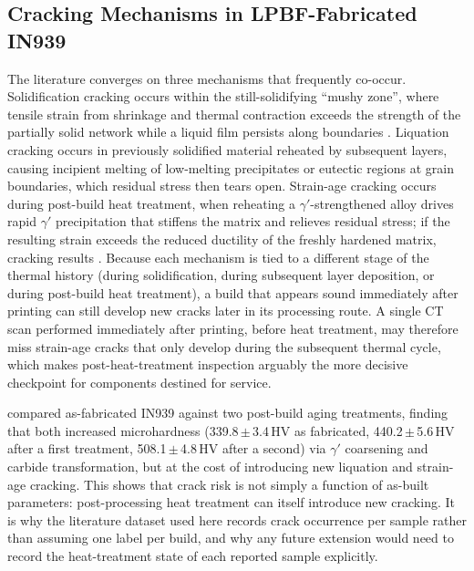 \documentclass[a4paper]{article}
\begin{document}
\subsection{Cracking Mechanisms in LPBF-Fabricated IN939}
The literature converges on three mechanisms that frequently co-occur. Solidification cracking occurs within the still-solidifying ``mushy zone'', where tensile strain from shrinkage and thermal contraction exceeds the strength of the partially solid network while a liquid film persists along boundaries \citep{ozer2024}. Liquation cracking occurs in previously solidified material reheated by subsequent layers, causing incipient melting of low-melting precipitates or eutectic regions at grain boundaries, which residual stress then tears open. Strain-age cracking occurs during post-build heat treatment, when reheating a $\gamma'$-strengthened alloy drives rapid $\gamma'$ precipitation that stiffens the matrix and relieves residual stress; if the resulting strain exceeds the reduced ductility of the freshly hardened matrix, cracking results \citep{ozer2024}. Because each mechanism is tied to a different stage of the thermal history (during solidification, during subsequent layer deposition, or during post-build heat treatment), a build that appears sound immediately after printing can still develop new cracks later in its processing route. A single CT scan performed immediately after printing, before heat treatment, may therefore miss strain-age cracks that only develop during the subsequent thermal cycle, which makes post-heat-treatment inspection arguably the more decisive checkpoint for components destined for service.

\citet{ozer2024} compared as-fabricated IN939 against two post-build aging treatments, finding that both increased microhardness (339.8\,$\pm$\,3.4\,HV as fabricated, 440.2\,$\pm$\,5.6\,HV after a first treatment, 508.1\,$\pm$\,4.8\,HV after a second) via $\gamma'$ coarsening and carbide transformation, but at the cost of introducing new liquation and strain-age cracking. This shows that crack risk is not simply a function of as-built parameters: post-processing heat treatment can itself introduce new cracking. It is why the literature dataset used here records crack occurrence per sample rather than assuming one label per build, and why any future extension would need to record the heat-treatment state of each reported sample explicitly.
\end{document}

